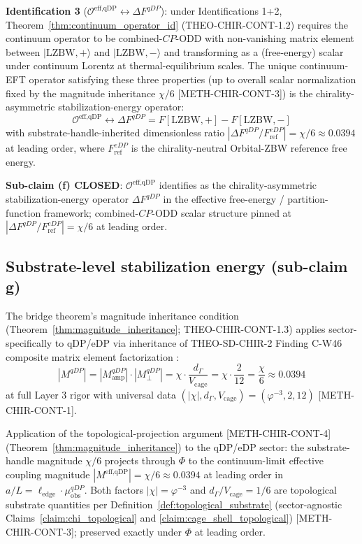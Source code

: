 \documentclass[11pt,letterpaper]{article}
\newcommand{\OeffqDP}{\mathcal{O}^{\text{eff,qDP}}}
\newcommand{\muobs}{\mu_{\text{obs}}}
\newcommand{\elledge}{\ell_{\text{edge}}}
\newcommand{\DeltaFqDP}{\Delta F^{qDP}}
\newcommand{\FeDPref}{F^{eDP}_{\text{ref}}}
\newcommand{\Vcage}{V_{\text{cage}}}
\newcommand{\dGamma}{d_\Gamma}
\newcommand{\methref}[1]{\textsf{\small[\textsc{#1}]}}
\begin{document}
\textbf{Identification 3} ($\OeffqDP \leftrightarrow \DeltaFqDP$): under Identifications 1+2, Theorem~\ref{thm:continuum_operator_id} (THEO-CHIR-CONT-1.2) requires the continuum operator to be combined-$CP$-ODD with non-vanishing matrix element between $|\text{LZBW},+\rangle$ and $|\text{LZBW},-\rangle$ and transforming as a (free-energy) scalar under continuum Lorentz at thermal-equilibrium scales. The unique continuum-EFT operator satisfying these three properties (up to overall scalar normalization fixed by the magnitude inheritance $\chi/6$ \methref{METH-CHIR-CONT-3}) is the chirality-asymmetric stabilization-energy operator:
\begin{equation}
\boxed{\OeffqDP \leftrightarrow \DeltaFqDP = F[\text{LZBW},+] - F[\text{LZBW},-]}
\label{eq:DeltaF_identification}
\end{equation}
with substrate-handle-inherited dimensionless ratio $|\DeltaFqDP / \FeDPref| = \chi/6 \approx 0.0394$ at leading order, where $\FeDPref$ is the chirality-neutral Orbital-ZBW reference free energy.

\textbf{Sub-claim (f) CLOSED}: $\OeffqDP$ identifies as the chirality-asymmetric stabilization-energy operator $\DeltaFqDP$ in the effective free-energy / partition-function framework; combined-$CP$-ODD scalar structure pinned at $|\DeltaFqDP/\FeDPref| = \chi/6$ at leading order.

\subsection{Substrate-level stabilization energy (sub-claim g)}
\label{sec:substrate_stabilization}

The bridge theorem's magnitude inheritance condition (Theorem~\ref{thm:magnitude_inheritance}; THEO-CHIR-CONT-1.3) applies sector-specifically to qDP/eDP via inheritance of THEO-SD-CHIR-2 Finding C-W46 composite matrix element factorization \cite{Capotauro}:
\begin{equation}
|M^{qDP}| = |M_{\text{amp}}^{qDP}| \cdot |M_\perp^{qDP}| = \chi \cdot \frac{\dGamma}{\Vcage} = \chi \cdot \frac{2}{12} = \frac{\chi}{6} \approx 0.0394
\label{eq:qDP_factorization}
\end{equation}
at full Layer 3 rigor with universal data $(|\chi|, \dGamma, \Vcage) = (\varphi^{-3}, 2, 12)$ \methref{METH-CHIR-CONT-1}.

Application of the topological-projection argument \methref{METH-CHIR-CONT-4} (Theorem~\ref{thm:magnitude_inheritance}) to the qDP/eDP sector: the substrate-handle magnitude $\chi/6$ projects through $\Phi$ to the continuum-limit effective coupling magnitude $|M^{\text{eff,qDP}}| = \chi/6 \approx 0.0394$ at leading order in $a/L = \elledge \cdot \muobs^{qDP}$. Both factors $|\chi| = \varphi^{-3}$ and $\dGamma/\Vcage = 1/6$ are topological substrate quantities per Definition~\ref{def:topological_substrate} (sector-agnostic Claims~\ref{claim:chi_topological} and \ref{claim:cage_shell_topological}) \methref{METH-CHIR-CONT-3}; preserved exactly under $\Phi$ at leading order.
\end{document}
